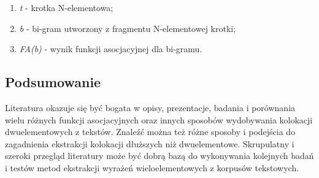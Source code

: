 \begin{enumerate}
	\item \emph{t} - krotka N-elementowa;
	\item \emph{b} - bi-gram utworzony z fragmentu N-elementowej krotki;
	\item \emph{FA(b)} - wynik funkcji asocjacyjnej dla bi-gramu.
\end{enumerate}


\subsection{Podsumowanie}
Literatura okazuje się być bogata w opisy, prezentacje, badania i porównania wielu różnych funkcji asocjacyjnych oraz innych sposobów wydobywania kolokacji dwuelementowych z tekstów.
Znaleźć można też różne sposoby i podejścia do zagadnienia ekstrakcji kolokacji dłuższych niż dwuelementowe.
Skrupulatny i szeroki przegląd literatury może być dobrą bazą do wykonywania kolejnych badań i testów metod ekstrakcji wyrażeń wieloelementowych z korpusów tekstowych.